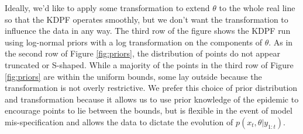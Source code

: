 \documentclass[useAMS,referee,usenatbib]{biom}
\begin{document}
Ideally, we'd like to apply some transformation to extend $\theta$ to the whole real line so that the KDPF operates smoothly, but we don't want the transformation to influence the data in any way.  The third row of the figure shows the KDPF run using log-normal priors with a log transformation on the components of $\theta$.  As in the second row of Figure \ref{fig:priors}, the distribution of points do not appear truncated or S-shaped.  While a majority of the points in the third row of Figure \ref{fig:priors} are within the uniform bounds, some lay outside because the transformation is not overly restrictive.  We prefer this choice of prior distribution and transformation because it allows us to use prior knowledge of the epidemic to encourage points to lie between the bounds, but is flexible in the event of model mis-specification and allows the data to dictate the evolution of $p(x_t,\theta|y_{1:t})$.
\end{document}
